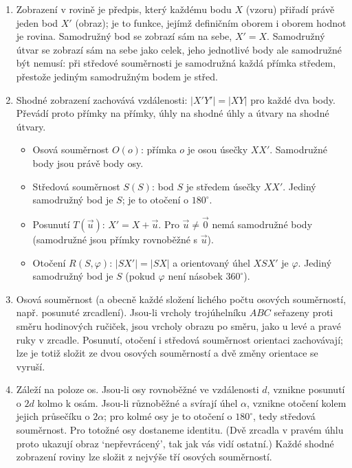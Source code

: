 \begin{enumerate}[label=\textbf{\arabic*.}, leftmargin=*, itemsep=0.8em]
  \item {}
  Zobrazení v rovině je předpis, který každému bodu $X$ (vzoru) přiřadí právě jeden bod $X'$ (obraz); je to funkce, jejímž definičním oborem i oborem hodnot je rovina. Samodružný bod se zobrazí sám na sebe, $X' = X$. Samodružný útvar se zobrazí sám na sebe jako celek, jeho jednotlivé body ale samodružné být nemusí: při středové souměrnosti je samodružná každá přímka středem, přestože jediným samodružným bodem je střed. 

  \item {}
  Shodné zobrazení zachovává vzdálenosti: $|X'Y'| = |XY|$ pro každé dva body. Převádí proto přímky na přímky, úhly na shodné úhly a útvary na shodné útvary.
  \begin{itemize}
    \item Osová souměrnost $O(o)$: přímka $o$ je osou úsečky $XX'$. Samodružné body jsou právě body osy.
    \item Středová souměrnost $S(S)$: bod $S$ je středem úsečky $XX'$. Jediný samodružný bod je $S$; je to otočení o $180^\circ$.
    \item Posunutí $T(\vec{u})$: $X' = X + \vec{u}$. Pro $\vec{u}\neq\vec{0}$ nemá samodružné body (samodružné jsou přímky rovnoběžné s $\vec{u}$).
    \item Otočení $R(S, \varphi)$: $|SX'| = |SX|$ a orientovaný úhel $XSX'$ je $\varphi$. Jediný samodružný bod je $S$ (pokud $\varphi$ není násobek $360^\circ$).
  \end{itemize}

  \item {}
  Osová souměrnost (a obecně každé složení lichého počtu osových souměrností, např. posunuté zrcadlení). Jsou-li vrcholy trojúhelníku $ABC$ seřazeny proti směru hodinových ručiček, jsou vrcholy obrazu po směru, jako u levé a pravé ruky v zrcadle. Posunutí, otočení i středová souměrnost orientaci zachovávají; lze je totiž složit ze dvou osových souměrností a dvě změny orientace se vyruší. 

  \item {}
  Záleží na poloze os. Jsou-li osy rovnoběžné ve vzdálenosti $d$, vznikne posunutí o $2d$ kolmo k osám. Jsou-li různoběžné a svírají úhel $\alpha$, vznikne otočení kolem jejich průsečíku o $2\alpha$; pro kolmé osy je to otočení o $180^\circ$, tedy středová souměrnost. Pro totožné osy dostaneme identitu. (Dvě zrcadla v pravém úhlu proto ukazují obraz `nepřevrácený', tak jak vás vidí ostatní.) Každé shodné zobrazení roviny lze složit z nejvýše tří osových souměrností. 


\end{enumerate}
